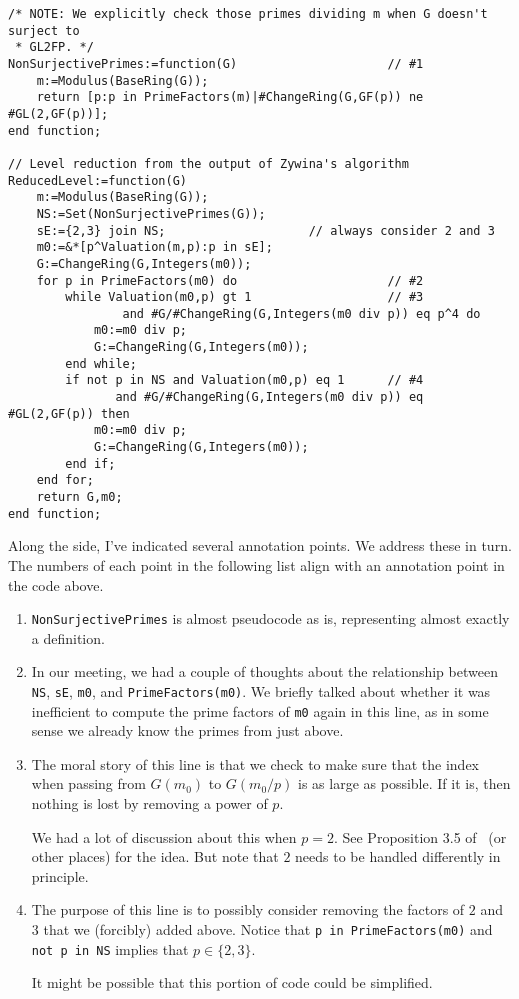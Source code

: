 \documentclass[11pt,reqno]{amsart}
\theoremstyle{plain}
\theoremstyle{definition}
\begin{document}
\begin{verbatim}
/* NOTE: We explicitly check those primes dividing m when G doesn't surject to
 * GL2FP. */
NonSurjectivePrimes:=function(G)                     // #1
    m:=Modulus(BaseRing(G));
    return [p:p in PrimeFactors(m)|#ChangeRing(G,GF(p)) ne #GL(2,GF(p))];
end function;

// Level reduction from the output of Zywina's algorithm
ReducedLevel:=function(G)
    m:=Modulus(BaseRing(G));
    NS:=Set(NonSurjectivePrimes(G));
    sE:={2,3} join NS;                    // always consider 2 and 3
    m0:=&*[p^Valuation(m,p):p in sE];
    G:=ChangeRing(G,Integers(m0));
    for p in PrimeFactors(m0) do                     // #2
        while Valuation(m0,p) gt 1                   // #3
                and #G/#ChangeRing(G,Integers(m0 div p)) eq p^4 do
            m0:=m0 div p;
            G:=ChangeRing(G,Integers(m0));
        end while;
        if not p in NS and Valuation(m0,p) eq 1      // #4
               and #G/#ChangeRing(G,Integers(m0 div p)) eq #GL(2,GF(p)) then
            m0:=m0 div p;
            G:=ChangeRing(G,Integers(m0));
        end if;
    end for;
    return G,m0;
end function;
\end{verbatim}

Along the side, I've indicated several annotation points. We address these in
turn. The numbers of each point in the following list align with an annotation
point in the code above.

\begin{enumerate}
  \item \texttt{NonSurjectivePrimes} is almost pseudocode as is, representing
  almost exactly a definition.

  \item In our meeting, we had a couple of thoughts about the relationship
  between \texttt{NS}, \texttt{sE}, \texttt{m0}, and
  \texttt{PrimeFactors(m0)}. We briefly talked about whether it was inefficient
  to compute the prime factors of \texttt{m0} again in this line, as in some
  sense we already know the primes from just above.

  \item The moral story of this line is that we check to make sure that the
  index when passing from $G(m_0)$ to $G(m_0/p)$ is as large as possible. If it
  is, then nothing is lost by removing a power of $p$.

  We had a lot of discussion about this when $p = 2$. See Proposition 3.5
  of~\cite{Bourdon2019} (or other places) for the idea. But note that $2$ needs
  to be handled differently in principle.

  \item The purpose of this line is to possibly consider removing the factors
  of $2$ and $3$ that we (forcibly) added above.
  Notice that \texttt{p in PrimeFactors(m0)} and \texttt{not p in NS} implies
  that $p \in \{2, 3\}$.

  It might be possible that this portion of code could be simplified.
\end{enumerate}
\end{document}
